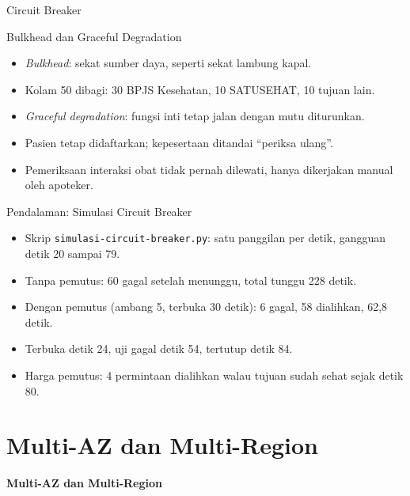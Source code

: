 \documentclass[aspectratio=169, table, 12pt]{beamer}
\begin{document}
\begin{frame}{{\Large Circuit Breaker}}
  \centering
\end{frame}

\begin{frame}{{\Large Bulkhead dan Graceful Degradation}}
  \vspace{6pt}
  \small
  \begin{itemize}
    \item \textit{Bulkhead}: sekat sumber daya, seperti sekat lambung kapal.
    \item Kolam 50 dibagi: 30 BPJS Kesehatan, 10 SATUSEHAT, 10 tujuan lain.
    \item \textit{Graceful degradation}: fungsi inti tetap jalan dengan mutu diturunkan.
    \item Pasien tetap didaftarkan; kepesertaan ditandai ``periksa ulang''.
    \item Pemeriksaan interaksi obat tidak pernah dilewati, hanya dikerjakan manual oleh apoteker.
  \end{itemize}
\end{frame}

\begin{frame}{{\Large Pendalaman: Simulasi Circuit Breaker}}
  \vspace{6pt}
  \small
  \begin{itemize}
    \item Skrip \texttt{simulasi-circuit-breaker.py}: satu panggilan per detik, gangguan detik 20
          sampai 79.
    \item Tanpa pemutus: 60 gagal setelah menunggu, total tunggu 228 detik.
    \item Dengan pemutus (ambang 5, terbuka 30 detik): 6 gagal, 58 dialihkan, 62,8 detik.
    \item Terbuka detik 24, uji gagal detik 54, tertutup detik 84.
    \item Harga pemutus: 4 permintaan dialihkan walau tujuan sudah sehat sejak detik 80.
  \end{itemize}
\end{frame}

\section{Multi-AZ dan Multi-Region}

\begin{frame}{\hfill}
  \centering
  \Huge{\textbf{Multi-AZ dan Multi-Region}}
\end{frame}
\end{document}
